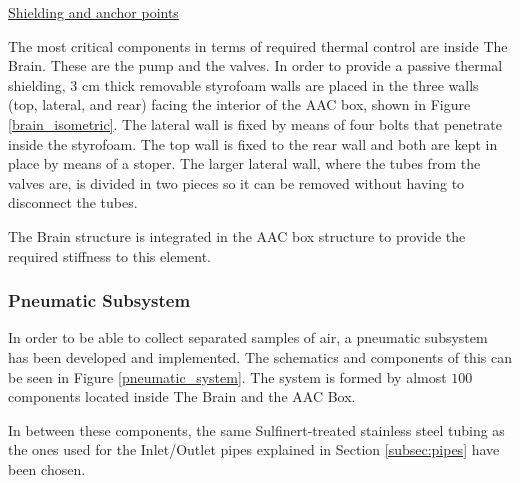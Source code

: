 \bigskip
\underline{Shielding and anchor points}

\smallskip
The most critical components in terms of required thermal control are inside The Brain. These are the pump and the valves. In order to provide a passive thermal shielding, 3 cm thick removable styrofoam walls are placed in the three walls (top, lateral, and rear) facing the interior of the AAC box, shown in Figure \ref{brain_isometric}. The lateral wall is fixed by means of four bolts that penetrate inside the styrofoam. The top wall is fixed to the rear wall and both are kept in place by means of a stoper. The larger lateral wall, where the tubes from the valves are, is divided in two pieces so it can be removed without having to disconnect the tubes. 

\smallskip
The Brain structure is integrated in the AAC box structure to provide the required stiffness to this element. 


\pagebreak
\subsubsection{Pneumatic Subsystem}
\label{sec:4.4.5}

In order to be able to collect separated samples of air, a pneumatic subsystem has been developed and implemented. The schematics and components of this can be seen in Figure \ref{pneumatic_system}. The system is formed by almost $100$ components located inside The Brain and the AAC Box. 

In between these components, the same Sulfinert-treated stainless steel tubing as the ones used for the Inlet/Outlet pipes explained in Section \ref{subsec:pipes} have been chosen. %

